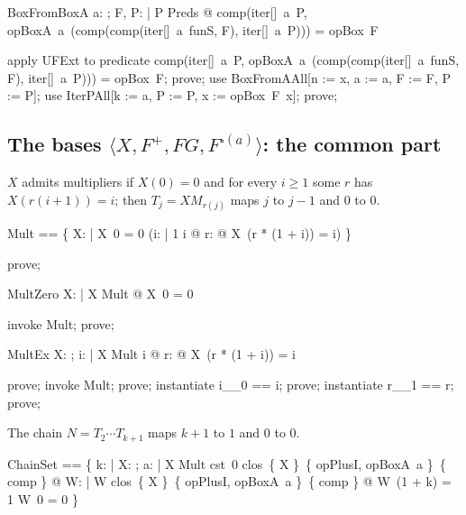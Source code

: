 \documentclass{article}
\begin{document}
\begin{theorem}{BoxFromBoxA}
  \forall a: \nat; F, P: \nat \fun \nat | P \in Preds @ comp(iter[\nat]~a~P, opBoxA~a~(comp(comp(iter[\nat]~a~funS, F), iter[\nat]~a~P))) = opBox~F
\end{theorem}

\begin{zproof}
apply UFExt to predicate comp(iter[\nat]~a~P, opBoxA~a~(comp(comp(iter[\nat]~a~funS, F), iter[\nat]~a~P))) = opBox~F;
prove;
use BoxFromAAll[n := x, a := a, F := F, P := P];
use IterPAll[k := a, P := P, x := opBox~F~x];
prove;
\end{zproof}

\subsection{The bases $\langle X, F^+, FG, F^{\square(a)}\rangle$: the common part}

$X$ admits multipliers if $X(0) = 0$ and for every $i \ge 1$ some $r$ has $X(r(i+1)) = i$;
then $T_j = X M_{r(j)}$ maps $j$ to $j - 1$ and $0$ to $0$.

\begin{zed}
  Mult == \{ X: \nat \fun \nat | X~0 = 0 \land (\forall i: \nat | 1 \leq i @ \exists r: \nat @ X~(r * (1 + i)) = i) \}
\end{zed}

\begin{zproof}
prove;
\end{zproof}

\begin{theorem}{MultZero}
  \forall X: \nat \fun \nat | X \in Mult @ X~0 = 0
\end{theorem}

\begin{zproof}
invoke Mult;
prove;
\end{zproof}

\begin{theorem}{MultEx}
  \forall X: \nat \fun \nat; i: \nat | X \in Mult  \leq i @ \exists r: \nat @ X~(r * (1 + i)) = i
\end{theorem}

\begin{zproof}
prove;
invoke Mult;
prove;
instantiate i\_\_0 == i;
prove;
instantiate r\_\_1 == r;
prove;
\end{zproof}

The chain $N = T_2 \cdots T_{k+1}$ maps $k+1$ to $1$ and $0$ to $0$.

\begin{zed}
  ChainSet == \{ k: \nat | \forall X: \nat \fun \nat; a: \nat | X \in Mult \land cst~0 \in clos~\{ X \}~\{ opPlusI, opBoxA~a \}~\{ comp \} @
    \exists W: \nat \fun \nat | W \in clos~\{ X \}~\{ opPlusI, opBoxA~a \}~\{ comp \} @ W~(1 + k) = 1 \land W~0 = 0 \}
\end{zed}
\end{document}
